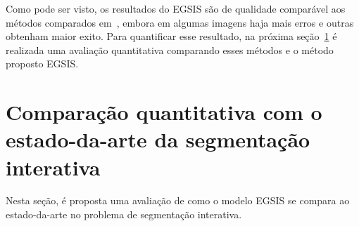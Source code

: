 \begin{figure}[h!]
        \captionsetup{width=12cm}
		\centering
\end{figure}
\FloatBarrier{}



Como pode ser visto, os resultados do \gls{EGSIS} são de qualidade
comparável aos métodos comparados em~\cite{wang2023review}, embora em
algumas imagens haja mais erros e outras obtenham maior exito. Para
quantificar esse resultado, na próxima
seção~\ref{sec:comparacao-estado-da-arte} é realizada uma avaliação
quantitativa comparando esses métodos e o método proposto \gls{EGSIS}.


\section{Comparação quantitativa com o estado-da-arte da segmentação interativa}\label{sec:comparacao-estado-da-arte}

Nesta seção, é proposta uma avaliação de como o modelo \gls{EGSIS} se
compara ao estado-da-arte no problema de segmentação interativa.

